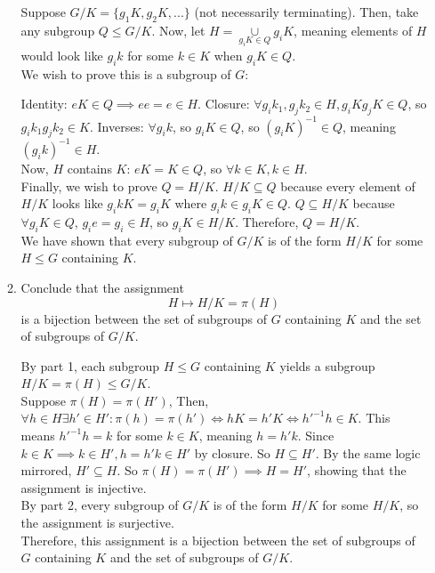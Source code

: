 \documentclass{amsart}
\begin{document}
\begin{enumerate}[itemsep=0.2in]
\begin{enumerate}
    Suppose $G/K=\{g_1K,g_2K,...\}$ (not necessarily terminating). Then, take any subgroup $Q\leq G/K$. Now, let $H=\underset{g_iK\in Q}\cup g_iK$, meaning elements of $H$ would look like $g_ik$ for some $k\in K$ when $g_iK\in Q$. \\

    We wish to prove this is a subgroup of $G$:

    Identity: $eK\in Q\implies ee=e\in H$.
    Closure: $\forall g_ik_1,g_jk_2\in H,g_iKg_jK\in Q$, so $g_ik_1g_jk_2\in K$.
    Inverses: $\forall g_ik$, so $g_iK\in Q$, so $(g_iK)^{-1}\in Q$, meaning $(g_ik)^{-1}\in H$.\\

    Now, $H$ contains $K$: $eK=K\in Q$, so $\forall k\in K,k\in H$.\\

    Finally, we wish to prove $Q=H/K$. $H/K\subseteq Q$ because every element of $H/K$ looks like $g_ikK=g_iK$ where $g_ik\in g_iK\in Q$. $Q\subseteq H/K$ because $\forall g_iK\in Q$, $g_ie=g_i\in H$, so $g_iK\in H/K$. Therefore, $Q=H/K$. \\

    We have shown that every subgroup of $G/K$ is of the form $H/K$ for some $H\leq G$ containing $K$. \\
    
	\item Conclude that the assignment
\[
H\mapsto H/K = \pi(H)
\]
is a bijection between the set of subgroups of $G$ containing $K$ and the set of subgroups of $G/K$.


By part 1, each subgroup $H\leq G$ containing $K$ yields a subgroup $H/K=\pi(H)\leq G/K$. \\

Suppose $\pi(H)=\pi(H')$, Then, $\forall h\in H\exists h'\in H':\pi(h)=\pi(h')\iff hK=h'K\iff 
h'^{-1}h\in K$. This means $h'^{-1}h=k$ for some $k\in K$, meaning $h=h'k$. Since $k\in K\implies k\in H',h=h'k\in H'$ by closure. So $H\subseteq H'$. By the same logic mirrored, $H'\subseteq H$. So $\pi(H)=\pi(H')\implies H=H'$, showing that the assignment is injective.\\

By part 2, every subgroup of $G/K$ is of the form $H/K$ for some $H/K$, so the assignment is surjective. \\

Therefore, this assignment is a bijection between the set of subgroups of $G$ containing $K$ and the set of subgroups of $G/K$. 




\end{enumerate}
\end{enumerate}
\end{document}
